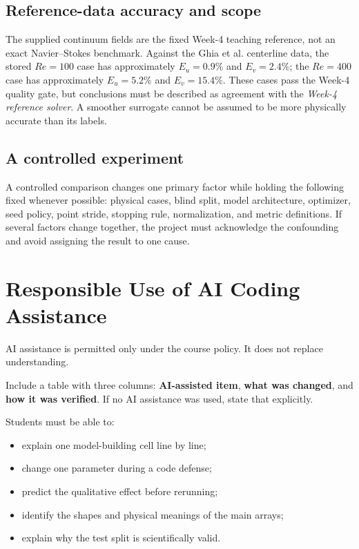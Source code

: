 \documentclass[11pt]{article}
\begin{document}
\subsection{Reference-data accuracy and scope}
The supplied continuum fields are the fixed Week-4 teaching reference, not an exact Navier--Stokes benchmark. Against the Ghia et al. centerline data, the stored $Re=100$ case has approximately $E_u=0.9\%$ and $E_v=2.4\%$; the $Re=400$ case has approximately $E_u=5.2\%$ and $E_v=15.4\%$. These cases pass the Week-4 quality gate, but conclusions must be described as agreement with the \emph{Week-4 reference solver}. A smoother surrogate cannot be assumed to be more physically accurate than its labels.

\subsection{A controlled experiment}
A controlled comparison changes one primary factor while holding the following fixed whenever possible: physical cases, blind split, model architecture, optimizer, seed policy, point stride, stopping rule, normalization, and metric definitions. If several factors change together, the project must acknowledge the confounding and avoid assigning the result to one cause.

\section{Responsible Use of AI Coding Assistance}
AI assistance is permitted only under the course policy. It does not replace understanding.

\begin{deliverbox}
Include a table with three columns: \textbf{AI-assisted item}, \textbf{what was changed}, and \textbf{how it was verified}. If no AI assistance was used, state that explicitly.
\end{deliverbox}

Students must be able to:
\begin{itemize}
\item explain one model-building cell line by line;
\item change one parameter during a code defense;
\item predict the qualitative effect before rerunning;
\item identify the shapes and physical meanings of the main arrays;
\item explain why the test split is scientifically valid.
\end{itemize}
\end{document}
